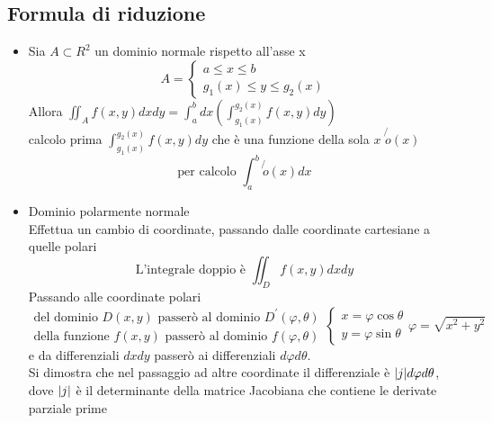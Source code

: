 \subsection{Formula di riduzione}
\begin{itemize}
\item Sia $A\subset R^2$ un dominio normale rispetto all'asse x
  \begin{equation*}
    A=\begin{cases}
        a\leq x\leq b\\
        g_1(x)\leq y\leq g_2(x)
      \end{cases}
  \end{equation*}
    Allora $\iint_A f(x,y) dxdy=\int_a^bdx \left(\int_{g_1(x)}^{g_2(x)}f(x,y)dy\right)$\\
    calcolo prima $\int_{g_1(x)}^{g_2(x)}f(x,y)dy$ che è una funzione della sola $x$ $\not{o}(x)$
    \begin{equation*}
      \text{per calcolo } \int^b_a \not{o} (x) dx
    \end{equation*}
  \item Dominio polarmente normale\\
    Effettua un cambio di coordinate, passando dalle coordinate cartesiane a quelle polari
    \begin{equation*}
      \text{L'integrale doppio è } \iint_Df(x,y)dxdy
    \end{equation*}
    Passando alle coordinate polari
    \begin{equation*}
      \begin{matrix}
        \text{del dominio } D(x,y) \text{ passerò al dominio } D^\prime (\varphi, \theta) \\
        \text{della funzione } f(x,y) \text{ passerò al dominio } f (\varphi, \theta)
      \end{matrix} \begin{cases}
                       x=\varphi\cos\theta\\
                     y=\varphi\sin\theta
                   \end{cases}
                   \varphi=\sqrt{x^2+y^2} 
   \end{equation*}
   e da differenziali $dxdy$ passerò ai differenziali $d\varphi d\theta$. \\
   Si dimostra che nel passaggio ad altre coordinate il differenziale è $\lvert j\rvert d\varphi d\theta$,
   dove $\lvert j\rvert$ è il determinante della {\color{red} matrice Jacobiana} che contiene le derivate
   parziale prime
   \begin{equation}

\end{equation}
\end{itemize}

